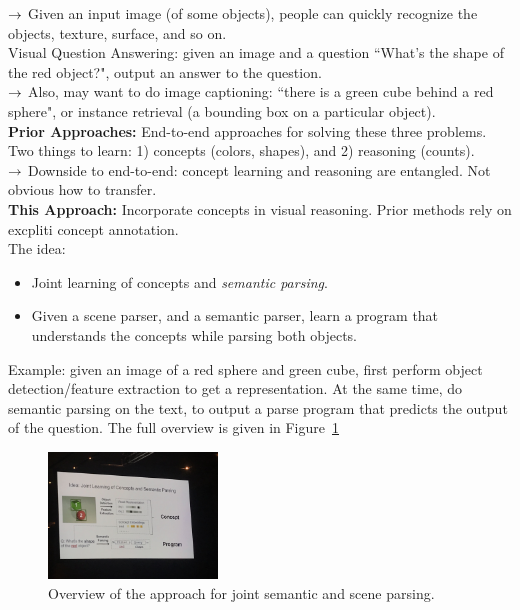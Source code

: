 $\rightarrow$ Given an input image (of some objects), people can quickly recognize the objects, texture, surface, and so on. \\

Visual Question Answering: given an image and a question ``What's the shape of the red object?", output an answer to the question. \\

$\rightarrow$ Also, may want to do image captioning: ``there is a green cube behind a red sphere", or instance retrieval (a bounding box on a particular object). \\

{\bf Prior Approaches:} End-to-end approaches for solving these three problems. Two things to learn: 1) concepts (colors, shapes), and 2) reasoning (counts). \\

$\rightarrow$ Downside to end-to-end: concept learning and reasoning are entangled. Not obvious how to transfer. \\

{\bf This Approach:} Incorporate concepts in visual reasoning. Prior methods rely on excpliti concept annotation. \\

The idea:
\begin{itemize}
    \item Joint learning of concepts and {\it semantic parsing}.
    \item Given a scene parser, and a semantic parser, learn a program that understands the concepts while parsing both objects.
\end{itemize}

Example: given an image of a red sphere and green cube, first perform object detection/feature extraction to get a representation. At the same time, do semantic parsing on the text, to output a parse program that predicts the output of the question. The full overview is given in Figure~\ref{fig:cube}

\begin{figure}[h!]
    \centering
    \includegraphics[width=0.4\textwidth]{images/cube.JPG}
    \caption{Overview of the approach for joint semantic and scene parsing.}
    \label{fig:cube}
\end{figure}

